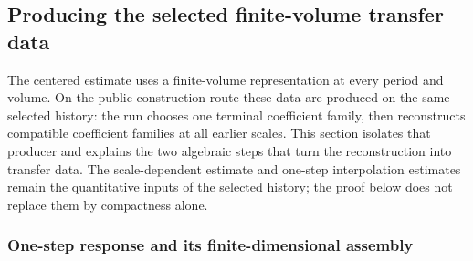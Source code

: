 \subsection{Producing the selected finite-volume transfer data}\label{ex-centered-freight-producer}

The centered estimate uses a finite-volume representation at every period and volume. On the public construction route these data are produced on the same selected history: the run chooses one terminal coefficient family, then reconstructs compatible coefficient families at all earlier scales. This section isolates that producer and explains the two algebraic steps that turn the reconstruction into transfer data. The scale-dependent estimate and one-step interpolation estimates remain the quantitative inputs of the selected history; the proof below does not replace them by compactness alone.

\subsubsection{One-step response and its finite-dimensional assembly}

